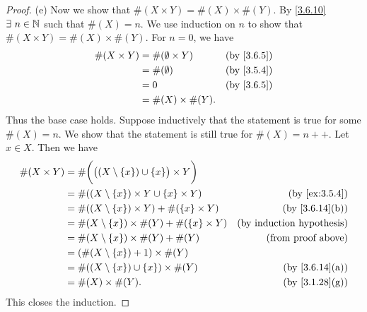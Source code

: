 \begin{proof}{(e)}
  Now we show that \(\#(X \times Y) = \#(X) \times \#(Y)\).
  By \cref{3.6.10} \(\exists\ n \in \N\) such that \(\#(X) = n\).
  We use induction on \(n\) to show that \(\#(X \times Y) = \#(X) \times \#(Y)\).
  For \(n = 0\), we have
  \begin{align*}
    \#(X \times Y) & = \#(\emptyset \times Y) & \text{(by \cref{3.6.5})} \\
                   & = \#(\emptyset)          & \text{(by \cref{3.5.4})} \\
                   & = 0                      & \text{(by \cref{3.6.5})} \\
                   & = \#(X) \times \#(Y).
  \end{align*}
  Thus the base case holds.
  Suppose inductively that the statement is true for some \(\#(X) = n\).
  We show that the statement is still true for \(\#(X) = n++\).
  Let \(x \in X\).
  Then we have
  \begin{align*}
    \#(X \times Y) & = \#\bigg(\big((X \setminus \{x\}) \cup \{x\}\big) \times Y\bigg)                                    \\
                   & = \#((X \setminus \{x\}) \times Y \cup \{x\} \times Y)            & \text{(by \cref{ex:3.5.4})}      \\
                   & = \#((X \setminus \{x\}) \times Y) + \#(\{x\} \times Y)           & \text{(by \cref{3.6.14}(b))}     \\
                   & = \#(X \setminus \{x\}) \times \#(Y) + \#(\{x\} \times Y)         & \text{(by induction hypothesis)} \\
                   & = \#(X \setminus \{x\}) \times \#(Y) + \#(Y)                      & \text{(from proof above)}        \\
                   & = (\#(X \setminus \{x\}) + 1) \times \#(Y)                                                           \\
                   & = \#((X \setminus \{x\}) \cup \{x\}) \times \#(Y)                 & \text{(by \cref{3.6.14}(a))}     \\
                   & = \#(X) \times \#(Y).                                             & \text{(by \cref{3.1.28}(g))}
  \end{align*}
  This closes the induction.
\end{proof}


